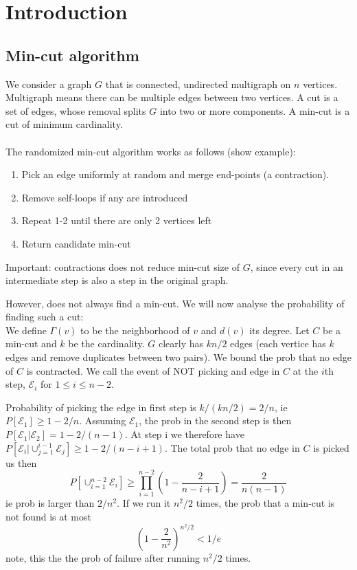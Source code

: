 \documentclass[a4paper]{article}
\begin{document}
\section{Introduction}

\subsection{Min-cut algorithm}
We consider a graph $G$ that is connected, undirected multigraph on $n$ vertices. Multigraph means there can be multiple edges between two vertices. A cut is a set of edges, whose removal splits $G$ into two or more components. A min-cut is a cut of minimum cardinality.\\
\\
The randomized min-cut algorithm works as follows (show example):
\begin{enumerate}
  \item Pick an edge uniformly at random and merge end-points (a contraction).
  \item Remove self-loops if any are introduced
  \item Repeat 1-2 until there are only 2 vertices left
  \item Return candidate min-cut
\end{enumerate}
Important: contractions does not reduce min-cut size of $G$, since every cut in an intermediate step is also a step in the original graph.

However, does not always find a min-cut. We will now analyse the probability of finding such a cut:\\

We define $\Gamma (v)$ to be the neighborhood of $v$ and $d(v)$ its degree. Let $C$ be a min-cut and $k$ be the cardinality. $G$ clearly has $kn/2$ edges (each vertice has $k$ edges and remove duplicates between two pairs). We bound the prob that no edge of $C$ is contracted. We call the event of NOT picking and edge in $C$ at the $i$th step, $\mathcal{E}_i$ for $1\leq i\leq n-2$.

Probability of picking the edge in first step is $k/(kn/2)=2/n$, ie $P[\mathcal{E}_1]\geq 1-2/n$. Assuming $\mathcal{E}_1$, the prob in the second step is then $P[\mathcal{E}_1| \mathcal{E}_2]=1-2/(n-1)$. At step i we therefore have $P[\mathcal{E}_i|\cup_{j=1}^{i-1}\mathcal{E}_j]\geq 1-2/(n-i+1)$. The total prob that no edge in $C$ is picked us then
$$
P[\cup_{i=1}^{n-2}\mathcal{E}_i]\geq \prod^{n-2}_{i=1} \left(1-\frac{2}{n-i+1}  \right) = \frac{2}{n(n-1)}
$$
ie prob is larger than $2/n^2$. If we run it $n^2/2$ times, the prob that a min-cut is not found is at most
$$
\left(1-\frac{2}{n^2} \right)^{n^2/2}< 1/e
$$
note, this the the prob of failure after running $n^2/2$ times.
\end{document}
